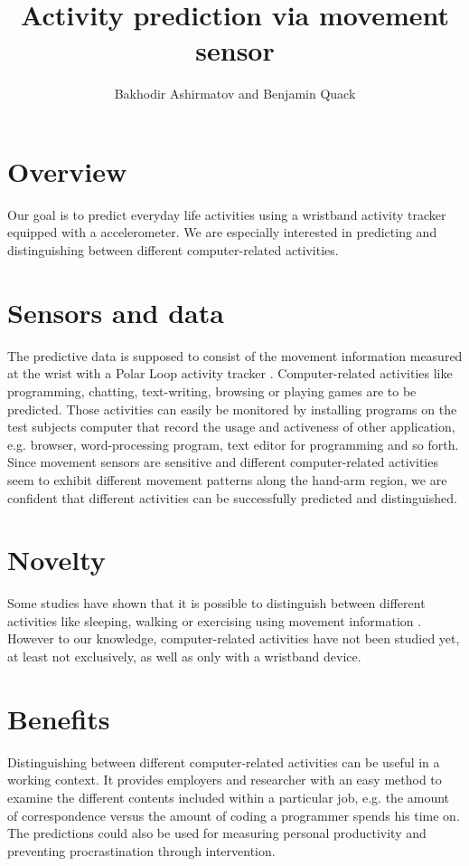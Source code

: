 \documentclass[11pt,a4paper]{paper}
\title{Activity prediction via movement sensor}
\author{Bakhodir Ashirmatov and Benjamin Quack}
\begin{document}
\maketitle

\section{Overview}

Our goal is to predict everyday life activities using a wristband activity tracker equipped 
 with a accelerometer.
We are especially interested in predicting and distinguishing between 
 different computer-related activities.
 
\section{Sensors and data}
 
The predictive data is supposed to consist of the movement information measured at the wrist with
 a Polar Loop activity tracker \cite{polarloop}.
Computer-related activities like programming, chatting, text-writing,
 browsing or playing games are to be predicted.
Those activities can easily be monitored by installing programs on the 
 test subjects computer that record the usage and activeness of other 
 application, e.g. browser, word-processing program, text editor for programming 
 and so forth.
Since movement sensors are sensitive and different computer-related activities
 seem to exhibit different movement patterns along the hand-arm region, 
 we are confident that different activities can be
 successfully predicted and distinguished.
 
 
\section{Novelty}

Some studies have shown that it is possible to distinguish between different 
 activities like sleeping, walking or exercising using movement information 
 \cite{banosetal2014}.
However to our knowledge, computer-related activities have not been studied yet, 
 at least not exclusively, as well as only with a wristband device.
  
  
\section{Benefits}

Distinguishing between different computer-related activities can be
 useful in a working context. 
It provides employers and researcher with an easy method to examine 
 the different contents included within a particular job, e.g.
 the amount of correspondence versus the amount of coding a programmer 
 spends his time on.
The predictions could also be used for measuring personal productivity 
 and preventing procrastination through intervention.




\end{document}
